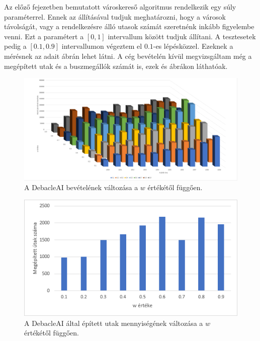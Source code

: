 
Az előző fejezetben bemutatott városkereső algoritmus rendelkezik egy súly paraméterrel. Ennek az állításával tudjuk meghatározni, hogy a városok távolságát, vagy a rendelkezésre álló utasok számát szeretnénk inkább figyelembe venni.  Ezt a paramétert a $[0,1]$ intervallum között tudjuk állítani. A tesztesetek pedig a $[0.1,0.9]$ intervallumon végeztem el $0.1$-es lépésközzel. Ezeknek a mérésnek az adait  ábrán lehet látni. A cég bevételén kívül megvizsgáltam még a megépített utak és a buszmegállók számát is, ezek  és  ábrákon láthatóak.

\begin{figure}
	\centering
	\includegraphics[width=\textwidth]{images/wmeresek.png}
	\caption{A DebacleAI bevételének változása a $w$ értékétől függően.}
	\label{fig:meresek}
\end{figure}

\begin{figure}
	\centering
	\includegraphics[width=\textwidth]{images/wutak.png}
	\caption{A DebacleAI által épített utak mennyiségének változása a $w$ értékétől függően.}
	\label{fig:utak}
\end{figure}

